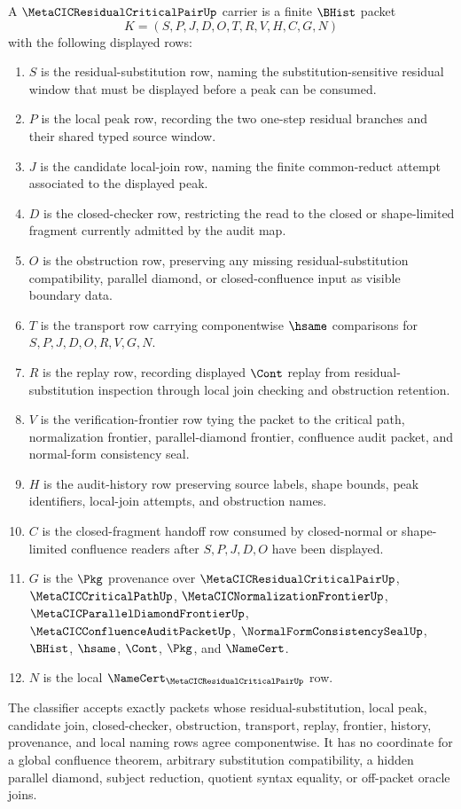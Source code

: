 \begin{definition}
\label{def:metacic-residual-critical-pair-carrier}
A $\MetaCICResidualCriticalPairUp$ carrier is a finite $\BHist$ packet
$$
K=(S,P,J,D,O,T,R,V,H,C,G,N)
$$
with the following displayed rows:
\begin{enumerate}
\item $S$ is the residual-substitution row, naming the substitution-sensitive residual window that must be displayed before a peak can be consumed.
\item $P$ is the local peak row, recording the two one-step residual branches and their shared typed source window.
\item $J$ is the candidate local-join row, naming the finite common-reduct attempt associated to the displayed peak.
\item $D$ is the closed-checker row, restricting the read to the closed or shape-limited fragment currently admitted by the audit map.
\item $O$ is the obstruction row, preserving any missing residual-substitution compatibility, parallel diamond, or closed-confluence input as visible boundary data.
\item $T$ is the transport row carrying componentwise $\hsame$ comparisons for $S,P,J,D,O,R,V,G,N$.
\item $R$ is the replay row, recording displayed $\Cont$ replay from residual-substitution inspection through local join checking and obstruction retention.
\item $V$ is the verification-frontier row tying the packet to the critical path, normalization frontier, parallel-diamond frontier, confluence audit packet, and normal-form consistency seal.
\item $H$ is the audit-history row preserving source labels, shape bounds, peak identifiers, local-join attempts, and obstruction names.
\item $C$ is the closed-fragment handoff row consumed by closed-normal or shape-limited confluence readers after $S,P,J,D,O$ have been displayed.
\item $G$ is the $\Pkg$ provenance over $\MetaCICResidualCriticalPairUp$, $\MetaCICCriticalPathUp$, $\MetaCICNormalizationFrontierUp$, $\MetaCICParallelDiamondFrontierUp$, $\MetaCICConfluenceAuditPacketUp$, $\NormalFormConsistencySealUp$, $\BHist$, $\hsame$, $\Cont$, $\Pkg$, and $\NameCert$.
\item $N$ is the local $\NameCert_{\MetaCICResidualCriticalPairUp}$ row.
\end{enumerate}
The classifier accepts exactly packets whose residual-substitution, local peak, candidate join, closed-checker, obstruction, transport, replay, frontier, history, provenance, and local naming rows agree componentwise. It has no coordinate for a global confluence theorem, arbitrary substitution compatibility, a hidden parallel diamond, subject reduction, quotient syntax equality, or off-packet oracle joins.
\end{definition}

